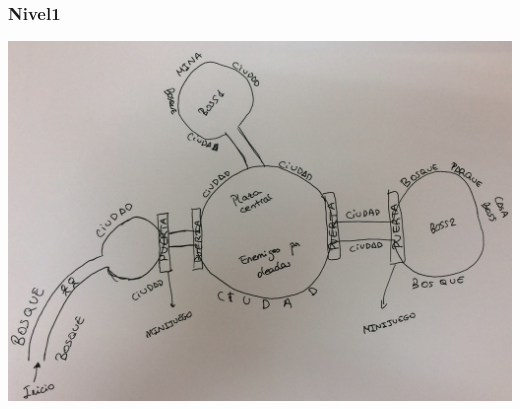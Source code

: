 \documentclass[11pt, twoside]{article}
\begin{document}
\subsubsection{Nivel1}
\includegraphics[width=16cm]{./images/Mapa1.png}
\end{document}
